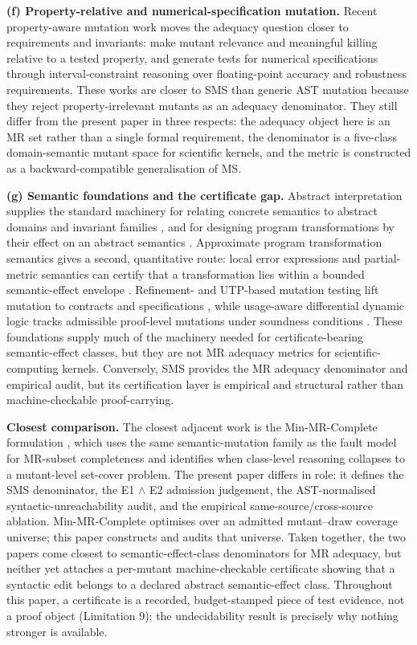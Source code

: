 \documentclass[manuscript,screen,review]{acmart}
\begin{document}
\textbf{(f) Property-relative and numerical-specification mutation.}
Recent property-aware mutation work moves the adequacy question closer
to requirements and invariants: \citet{bartocci2023propertymut} make mutant
relevance and meaningful killing relative to a tested property, and
\citet{jeangoudoux2021interval} generate tests for numerical
specifications through interval-constraint reasoning over floating-point
accuracy and robustness requirements. These works are closer to SMS than
generic AST mutation because they reject property-irrelevant mutants as
an adequacy denominator. They still differ from the present paper in
three respects: the adequacy object here is an MR set rather than a
single formal requirement, the denominator is a five-class
domain-semantic mutant space for scientific kernels, and the metric is
constructed as a backward-compatible generalisation of MS.

\textbf{(g) Semantic foundations and the certificate gap.} Abstract
interpretation supplies the standard machinery for relating concrete
semantics to abstract domains and invariant families \citep{cousot1992absint},
and for designing program transformations by their effect on an
abstract semantics \citep{cousot2002transform}. Approximate program
transformation semantics gives a second, quantitative route: local error
expressions and partial-metric semantics can certify that a
transformation lies within a bounded semantic-effect envelope \citep{westbrook2013approx,geoffroy2021partialmetric}. Refinement- and
UTP-based mutation testing lift mutation to contracts and
specifications \citep{aichernig2002contract,aichernig2007utp}, while
usage-aware differential dynamic logic tracks admissible proof-level
mutations under soundness conditions \citep{dotzel2023usageaware}. These foundations supply much of the machinery needed for
certificate-bearing semantic-effect classes, but they are not MR
adequacy metrics for scientific-computing kernels. Conversely, SMS
provides the MR adequacy denominator and empirical audit, but its
certification layer is empirical and structural rather than
machine-checkable proof-carrying.

\textbf{Closest comparison.} The closest adjacent work is the
Min-MR-Complete formulation \citep{li2026minmrcomplete}, which uses
the same semantic-mutation family as the fault model for MR-subset
completeness and identifies when class-level reasoning collapses to a
mutant-level set-cover problem. The present paper differs in role: it
defines the SMS denominator, the E1 $\wedge$ E2 admission judgement, the
AST-normalised syntactic-unreachability audit, and the empirical
same-source/cross-source ablation. Min-MR-Complete optimises over an
admitted mutant--draw coverage universe; this paper constructs and
audits that universe. Taken together, the two papers come closest to
semantic-effect-class denominators for MR adequacy, but neither yet
attaches a per-mutant machine-checkable certificate showing that a
syntactic edit belongs to a declared abstract semantic-effect class.
Throughout this paper, a certificate is a recorded, budget-stamped
piece of test evidence, not a proof object (Limitation 9); the
undecidability result is precisely why nothing stronger is available.
\end{document}
